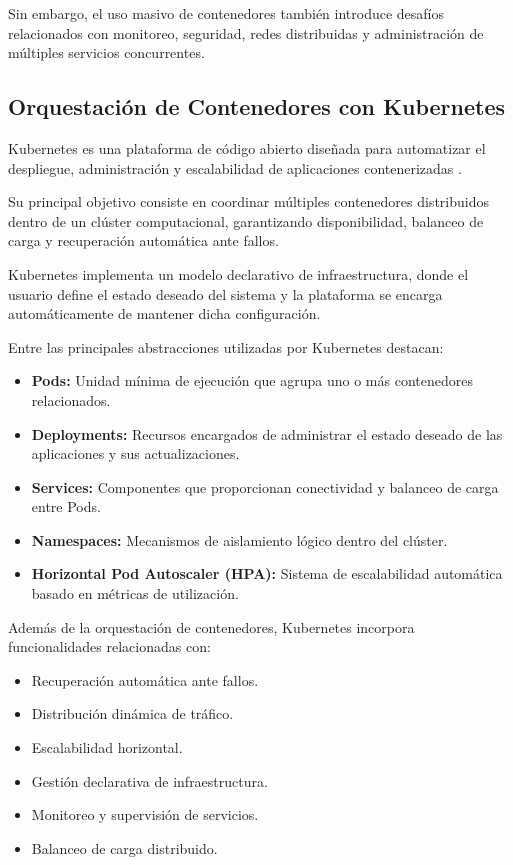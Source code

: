 \documentclass[12pt, oneside, letterpaper]{book}
\begin{document}
Sin embargo, el uso masivo de contenedores también introduce desafíos relacionados con monitoreo, seguridad, redes distribuidas y administración de múltiples servicios concurrentes.

\subsection{Orquestación de Contenedores con Kubernetes}

Kubernetes es una plataforma de código abierto diseñada para automatizar el despliegue, administración y escalabilidad de aplicaciones contenerizadas \cite{59}.

Su principal objetivo consiste en coordinar múltiples contenedores distribuidos dentro de un clúster computacional, garantizando disponibilidad, balanceo de carga y recuperación automática ante fallos.

Kubernetes implementa un modelo declarativo de infraestructura, donde el usuario define el estado deseado del sistema y la plataforma se encarga automáticamente de mantener dicha configuración.

Entre las principales abstracciones utilizadas por Kubernetes destacan:

\begin{itemize}

\item \textbf{Pods:} Unidad mínima de ejecución que agrupa uno o más contenedores relacionados.

\item \textbf{Deployments:} Recursos encargados de administrar el estado deseado de las aplicaciones y sus actualizaciones.

\item \textbf{Services:} Componentes que proporcionan conectividad y balanceo de carga entre Pods.

\item \textbf{Namespaces:} Mecanismos de aislamiento lógico dentro del clúster.

\item \textbf{Horizontal Pod Autoscaler (HPA):} Sistema de escalabilidad automática basado en métricas de utilización.
\end{itemize}

Además de la orquestación de contenedores, Kubernetes incorpora funcionalidades relacionadas con:

\begin{itemize}
\item Recuperación automática ante fallos.
\item Distribución dinámica de tráfico.
\item Escalabilidad horizontal.
\item Gestión declarativa de infraestructura.
\item Monitoreo y supervisión de servicios.
\item Balanceo de carga distribuido.
\end{itemize}
\end{document}
